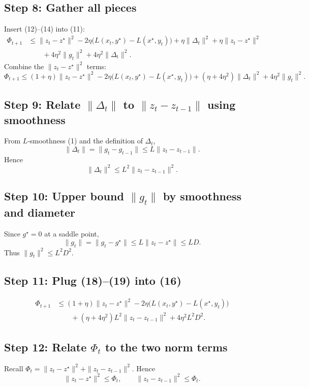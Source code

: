 \documentclass{article}
\begin{document}
\subsection*{Step 8: Gather all pieces}
Insert (12)–(14) into (11):
\begin{align}
\Phi_{t+1}
&\le \|z_{t}-z^{\star}\|^{2}
   -2\eta\bigl(L(x_{t},y^{\star})-L(x^{\star},y_{t})\bigr)
   +\eta\|\Delta_{t}\|^{2}+\eta\|z_{t}-z^{\star}\|^{2} \nonumber\\
&\qquad +4\eta^{2}\|g_{t}\|^{2}+4\eta^{2}\|\Delta_{t}\|^{2}. \tag{15}
\end{align}
Combine the $\|z_{t}-z^{\star}\|^{2}$ terms:
\[
\Phi_{t+1}\le (1+\eta)\|z_{t}-z^{\star}\|^{2}
          -2\eta\bigl(L(x_{t},y^{\star})-L(x^{\star},y_{t})\bigr)
          + ( \eta+4\eta^{2})\|\Delta_{t}\|^{2}+4\eta^{2}\|g_{t}\|^{2}. \tag{16}
\]

\subsection*{Step 9: Relate $\|\Delta_{t}\|$ to $\|z_{t}-z_{t-1}\|$ using smoothness}
From $L$‑smoothness (1) and the definition of $\Delta_{t}$,
\[
\|\Delta_{t}\| =\|g_{t}-g_{t-1}\|\le L\|z_{t}-z_{t-1}\|. \tag{17}
\]
Hence
\[
\|\Delta_{t}\|^{2}\le L^{2}\|z_{t}-z_{t-1}\|^{2}. \tag{18}
\]

\subsection*{Step 10: Upper bound $\|g_{t}\|$ by smoothness and diameter}
Since $g^{\star}=0$ at a saddle point,
\[
\|g_{t}\|=\|g_{t}-g^{\star}\|\le L\|z_{t}-z^{\star}\|\le LD. \tag{19}
\]
Thus $\|g_{t}\|^{2}\le L^{2}D^{2}$.

\subsection*{Step 11: Plug (18)–(19) into (16)}
\begin{align}
\Phi_{t+1}
&\le (1+\eta)\|z_{t}-z^{\star}\|^{2}
      -2\eta\bigl(L(x_{t},y^{\star})-L(x^{\star},y_{t})\bigr)   \nonumber\\
&\qquad +(\eta+4\eta^{2})L^{2}\|z_{t}-z_{t-1}\|^{2}+4\eta^{2}L^{2}D^{2}. \tag{20}
\end{align}

\subsection*{Step 12: Relate $\Phi_{t}$ to the two norm terms}
Recall $\Phi_{t}= \|z_{t}-z^{\star}\|^{2}+ \|z_{t}-z_{t-1}\|^{2}$.
Hence
\[
\|z_{t}-z^{\star}\|^{2}\le \Phi_{t},\qquad
\|z_{t}-z_{t-1}\|^{2}\le \Phi_{t}. \tag{21}
\]
\end{document}
